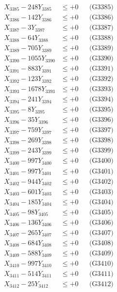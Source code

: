 \documentclass[a4paper,10pt]{article}
\begin{document}
{\begin{align}
X_{3385} - 248Y_{3385} &\leq +0 && \text{(G3385)} \\
X_{3386} - 142Y_{3386} &\leq +0 && \text{(G3386)} \\
X_{3387} - 3Y_{3387} &\leq +0 && \text{(G3387)} \\
X_{3388} - 64Y_{3388} &\leq +0 && \text{(G3388)} \\
X_{3389} - 705Y_{3389} &\leq +0 && \text{(G3389)} \\
X_{3390} - 1055Y_{3390} &\leq +0 && \text{(G3390)} \\
\allowbreak
X_{3391} - 883Y_{3391} &\leq +0 && \text{(G3391)} \\
X_{3392} - 123Y_{3392} &\leq +0 && \text{(G3392)} \\
X_{3393} - 1678Y_{3393} &\leq +0 && \text{(G3393)} \\
X_{3394} - 241Y_{3394} &\leq +0 && \text{(G3394)} \\
X_{3395} - 8Y_{3395} &\leq +0 && \text{(G3395)} \\
X_{3396} - 35Y_{3396} &\leq +0 && \text{(G3396)} \\
X_{3397} - 759Y_{3397} &\leq +0 && \text{(G3397)} \\
X_{3398} - 269Y_{3398} &\leq +0 && \text{(G3398)} \\
X_{3399} - 243Y_{3399} &\leq +0 && \text{(G3399)} \\
X_{3400} - 997Y_{3400} &\leq +0 && \text{(G3400)} \\
\allowbreak
X_{3401} - 997Y_{3401} &\leq +0 && \text{(G3401)} \\
X_{3402} - 944Y_{3402} &\leq +0 && \text{(G3402)} \\
X_{3403} - 601Y_{3403} &\leq +0 && \text{(G3403)} \\
X_{3404} - 185Y_{3404} &\leq +0 && \text{(G3404)} \\
X_{3405} - 98Y_{3405} &\leq +0 && \text{(G3405)} \\
X_{3406} - 136Y_{3406} &\leq +0 && \text{(G3406)} \\
X_{3407} - 265Y_{3407} &\leq +0 && \text{(G3407)} \\
X_{3408} - 684Y_{3408} &\leq +0 && \text{(G3408)} \\
X_{3409} - 588Y_{3409} &\leq +0 && \text{(G3409)} \\
X_{3410} - 997Y_{3410} &\leq +0 && \text{(G3410)} \\
\allowbreak
X_{3411} - 514Y_{3411} &\leq +0 && \text{(G3411)} \\
X_{3412} - 25Y_{3412} &\leq +0 && \text{(G3412)} \\

\end{align}}
\end{document}
